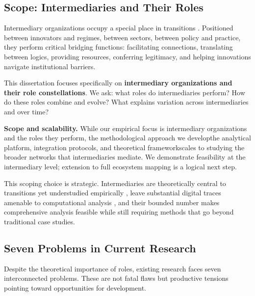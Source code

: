 \documentclass[../main.tex]{subfiles}
\begin{document}
\subsection{Scope: Intermediaries and Their Roles}

Intermediary organizations occupy a special place in transitions \cite{kivimaa2019innovation,kanda2020conceptualising,vanlente2020intermediaries}. Positioned between innovators and regimes, between sectors, between policy and practice, they perform critical bridging functions: facilitating connections, translating between logics, providing resources, conferring legitimacy, and helping innovations navigate institutional barriers.

This dissertation focuses specifically on \textbf{intermediary organizations and their role constellations}. We ask: what roles do intermediaries perform? How do these roles combine and evolve? What explains variation across intermediaries and over time?

\begin{importantbox}
\textbf{Scope and scalability.} While our empirical focus is intermediary organizations and the roles they perform, the methodological approach we develop\textemdash the analytical platform, integration protocols, and theoretical framework\textemdash scales to studying the broader networks that intermediaries mediate. We demonstrate feasibility at the intermediary level; extension to full ecosystem mapping is a logical next step.
\end{importantbox}

This scoping choice is strategic. Intermediaries are theoretically central to transitions yet understudied empirically \cite{howells2006intermediation,vanLente2003roles}, leave substantial digital traces amenable to computational analysis \cite{salganik2019bitbybit}, and their bounded number makes comprehensive analysis feasible while still requiring methods that go beyond traditional case studies.

\subsection{Seven Problems in Current Research}

Despite the theoretical importance of roles, existing research faces seven interconnected problems. These are not fatal flaws but productive tensions pointing toward opportunities for development.
\end{document}
